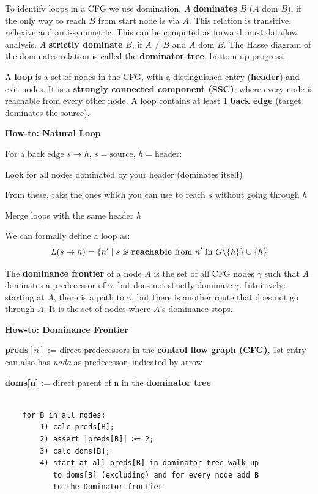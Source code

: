 To identify loops in a CFG we use domination. $A$ \textbf{dominates} $B$ ($A$ dom $B$), if the only way to reach $B$ from start node is via $A$. This relation is transitive, reflexive and anti-symmetric. This can be computed as forward must dataflow analysis. $A$ \textbf{strictly dominate} $B$, if $A \neq B$ and $A$ dom $B$. The Hasse diagram of the dominates relation is called the \textbf{dominator tree}. bottom-up progress.\medskip

A \textbf{loop} is a set of nodes in the CFG, with a distinguished entry (\textbf{header}) and exit nodes. It is a \textbf{strongly connected component (SSC)}, where every node is reachable from every other node. A loop contains at least 1 \textbf{back edge} (target dominates the source).\medskip

\textbf{How-to: Natural Loop}

For a back edge $s \rightarrow h$, $s=\text{source, }h=\text{header}$:
\begin{compactitem}[$\quad\bullet$]
	\item Look for all nodes dominated by your header (dominates itself)
	\item From these, take the ones which you can use to reach $s$ without going through $h$
	\item Merge loops with the same header $h$
\end{compactitem}\smallskip

We can formally define a loop as:
$$L(s \to h) = \{ n' \; | \; s \text{ is \textbf{reachable} from } n' \text{ in } G
	\backslash\{h\}  \} \cup \{h\}$$

\vspace{3pt}
The \textbf{dominance frontier} of a node $A$ is the set of all CFG nodes
$\gamma$ such that $A$ dominates a predecessor of $\gamma$, but does not
strictly dominate $\gamma$. Intuitively: starting at $A$, there is a path to $\gamma$, but there is another route that does not go through $A$. It is the set of nodes where $A$'s dominance stops. \medskip

\textbf{How-to: Dominance Frontier}

\textbf{preds$[n]$} := direct predecessors in the \textbf{control flow graph (CFG)}, 1st entry can also has \textit{nada} as predecessor, indicated by arrow

\textbf{doms[n]} := direct parent of n in the \textbf{dominator tree}
\begin{algorithm}
\begin{verbatim}

    for B in all nodes:
        1) calc preds[B];
        2) assert |preds[B]| >= 2;
        3) calc doms[B];
        4) start at all preds[B] in dominator tree walk up
           to doms[B] (excluding) and for every node add B 
           to the Dominator frontier    
\end{verbatim}
\end{algorithm}

